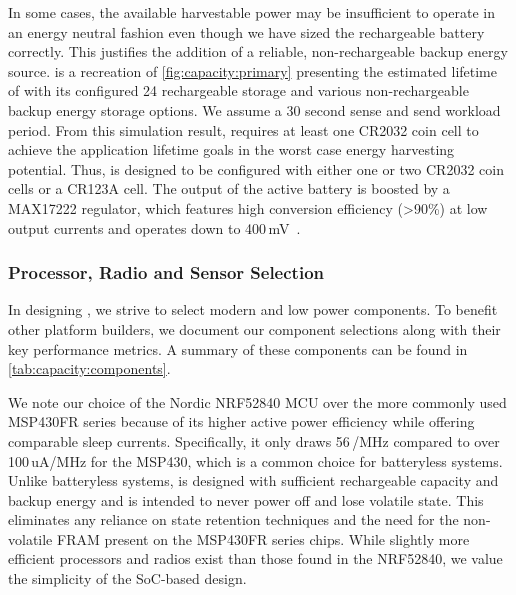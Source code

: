 In some cases, the available harvestable power may be insufficient to operate in an energy neutral fashion even though we have sized the rechargeable battery correctly.
This justifies the addition of a reliable, non-rechargeable backup energy source.
 is a recreation of \cref{fig:capacity:primary} presenting the estimated lifetime of \name with its configured 24\ssi{\micro\Wh} rechargeable storage and various non-rechargeable backup energy storage options. We assume a 30 second sense and send workload period.
From this simulation result, \name requires at least one CR2032 coin cell to achieve the application lifetime goals in the worst case energy harvesting potential.
Thus, \name is designed to be configured with either one or two CR2032 coin
cells or a CR123A cell. 
The output of the active battery
is boosted by a MAX17222 regulator, which features high conversion efficiency
(>90\%) at low output currents and operates down to 400\,mV~\cite{max17222}.

\subsubsection{Processor, Radio and Sensor Selection}
In designing \name, we strive to select modern and low power components.
To benefit other
platform builders, we document our component selections
along with their key performance metrics. A summary of these
components can be found in \cref{tab:capacity:components}.

We note our choice of the Nordic NRF52840 MCU over the more commonly used MSP430FR series
because of its higher active power efficiency while offering comparable sleep currents.
Specifically, it only draws 56\,\uA/MHz compared to over 100\,uA/MHz
for the MSP430, which is a common choice for batteryless systems. 
Unlike batteryless systems,
\name is designed with sufficient rechargeable capacity and backup energy and is intended to never power off and lose volatile state. 
This eliminates any reliance on state retention techniques and the need for the non-volatile FRAM present on the MSP430FR series chips. 
While
slightly more efficient
processors and radios exist than those found in the NRF52840,
we value the simplicity of the SoC-based design. 

